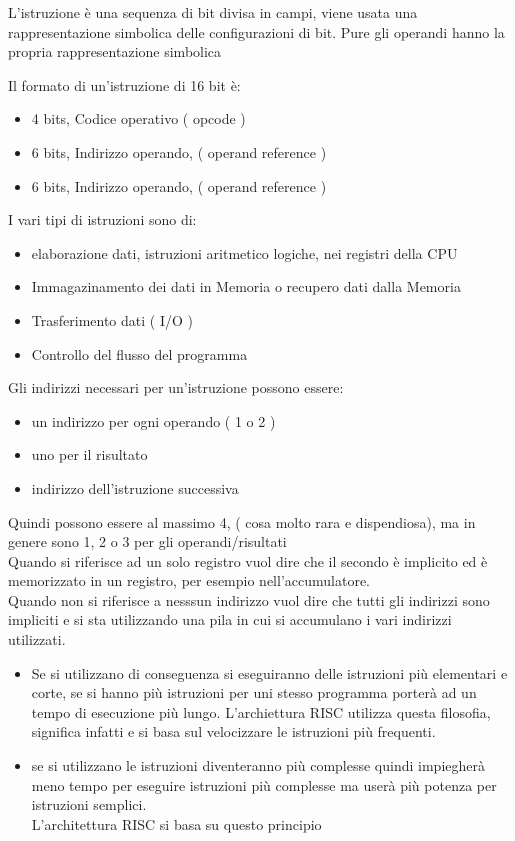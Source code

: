 \documentclass[arch.tex]{subfiles}
\begin{document}
L'istruzione è una sequenza di bit divisa in campi, viene usata una 
rappresentazione simbolica delle configurazioni di bit. Pure gli operandi
hanno la propria rappresentazione simbolica

Il formato di un'istruzione di 16 bit è:

\begin{itemize}
	\item 4 bits, Codice operativo ( opcode ) 
	\item 6 bits, Indirizzo operando, ( operand reference )
	\item 6 bits, Indirizzo operando, ( operand reference ) 
\end{itemize}

I vari tipi di istruzioni sono di:

\begin{itemize}
	\item elaborazione dati, istruzioni aritmetico logiche, nei registri della
		CPU
	\item Immagazinamento dei dati in Memoria o recupero dati dalla Memoria
	\item Trasferimento dati ( I/O ) 
	\item Controllo del flusso del programma		
\end{itemize}
Gli indirizzi necessari per un'istruzione possono essere:

\begin{itemize}
	\item un indirizzo per ogni operando ( 1 o 2 ) 
	\item uno per il risultato
	\item indirizzo dell'istruzione successiva
\end{itemize}
Quindi possono essere al massimo 4, ( cosa molto rara e dispendiosa), ma in genere
sono 1, 2 o 3 per gli operandi/risultati\\
Quando si riferisce ad un solo registro vuol dire che il secondo è implicito ed è 
memorizzato in un registro, per esempio nell'accumulatore.\\
Quando non si riferisce a nesssun indirizzo vuol dire che tutti gli indirizzi sono
impliciti e si sta utilizzando una pila in cui si accumulano i vari indirizzi
utilizzati.\\

\begin{itemize}
	\item Se si utilizzano  di conseguenza si eseguiranno
		delle istruzioni più elementari e corte, se si hanno 
		più istruzioni per uni stesso programma porterà ad un tempo 
		di esecuzione più lungo. L'archiettura RISC utilizza questa 
		filosofia, significa infatti 
		e si basa sul velocizzare le istruzioni più frequenti.
	\item se si utilizzano  le istruzioni diventeranno 
		più complesse quindi impiegherà meno tempo per eseguire istruzioni
		più complesse ma userà più potenza per istruzioni semplici.\\
		L'architettura RISC si basa su questo principio 
\end{itemize}
\end{document}

